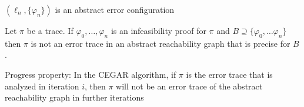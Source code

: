 \documentclass[landscape, a4paper]{article}
\begin{document}
\begin{minipage}[t]{0.2\linewidth}
\begin{betterlist}
\begin{betterlist}
			\item $(\ell_n, \{ \varphi_n\} )$ is an abstract error configuration
      \end{betterlist}\color{black}
		\item Let $\pi$  be a trace. If $\varphi_0,\ldots , \varphi_n$ is an infeasibility proof for $\pi$  and $B \supseteq \{ \varphi_0,\ldots \varphi_n\}$  then $\pi$  is not an error trace in an abstract reachability graph that is precise for $B$. 
		\item \alert{Progress property:} In the CEGAR algorithm, if $\pi$ is the error trace that is analyzed in iteration $i$, then $\pi$ will not be an error trace of the abstract reachability graph in further iterations
	\end{betterlist}
\end{minipage}

\newpage
\end{document}
